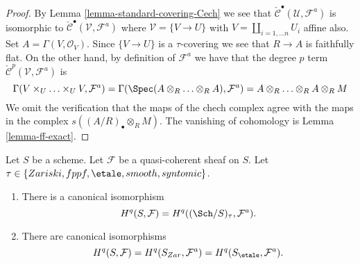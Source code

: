 \begin{proof}
By Lemma \ref{lemma-standard-covering-Cech} we see that
$\check{\mathcal{C}}^\bullet(\mathcal{U}, \mathcal{F}^a)$
is isomorphic to $\check{\mathcal{C}}^\bullet(\mathcal{V}, \mathcal{F}^a)$
where $\mathcal{V} = \{V \to U\}$ with $V = \coprod_{i = 1, \ldots n} U_i$
affine also. Set $A = \Gamma(V, \mathcal{O}_V)$. Since $\{V \to U\}$
is a $\tau$-covering we see that $R \to A$ is faithfully flat.
On the other hand, by definition of $\mathcal{F}^a$ we have
that the degree $p$ term $\check{\mathcal{C}}^p(\mathcal{V}, \mathcal{F}^a)$
is
$$
\Gamma(V \times_U \ldots \times_U V, \mathcal{F}^a)
=
\Gamma(\Spec(A \otimes_R \ldots \otimes_R A), \mathcal{F}^a)
=
A \otimes_R \ldots \otimes_R A \otimes_R M
$$
We omit the verification that the maps of the chech complex agree with
the maps in the complex $s((A/R)_\bullet \otimes_R M)$. The vanishing
of cohomology is Lemma \ref{lemma-ff-exact}.
\end{proof}

\begin{proposition}
\label{proposition-same-cohomology-quasi-coherent}
Let $S$ be a scheme. Let $\mathcal{F}$ be a quasi-coherent sheaf on $S$.
Let $\tau \in \{Zariski, \linebreak[0] fppf, \linebreak[0]
\etale, \linebreak[0] smooth, \linebreak[0] syntomic\}$.
\begin{enumerate}
\item There is a canonical isomorphism
$$
H^q(S, \mathcal{F}) = H^q((\Sch/S)_\tau, \mathcal{F}^a).
$$
\item There are canonical isomorphisms
$$
H^q(S, \mathcal{F}) =
H^q(S_{Zar}, \mathcal{F}^a) =
H^q(S_\etale, \mathcal{F}^a).
$$
\end{enumerate}
\end{proposition}

